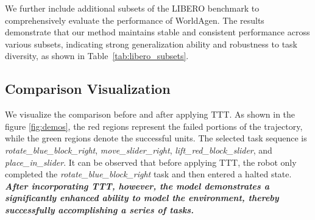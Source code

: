 We further include additional subsets of the LIBERO benchmark to comprehensively evaluate the performance of WorldAgen. The results demonstrate that our method maintains stable and consistent performance across various subsets, indicating strong generalization ability and robustness to task diversity, as shown in Table~\ref{tab:libero_subsets}.

\subsection{Comparison Visualization}

We visualize the comparison before and after applying TTT. As shown in the figure \ref{fig:demos}, the red regions represent the failed portions of the trajectory, while the green regions denote the successful units. The selected task sequence is \textit{rotate\_blue\_block\_right}, \textit{move\_slider\_right}, \textit{lift\_red\_block\_slider}, and \textit{place\_in\_slider}. It can be observed that before applying TTT, the robot only completed the \textit{rotate\_blue\_block\_right} task and then entered a halted state. \textbf{\textit{After incorporating TTT, however, the model demonstrates a significantly enhanced ability to model the environment, thereby successfully accomplishing a series of tasks.}}


